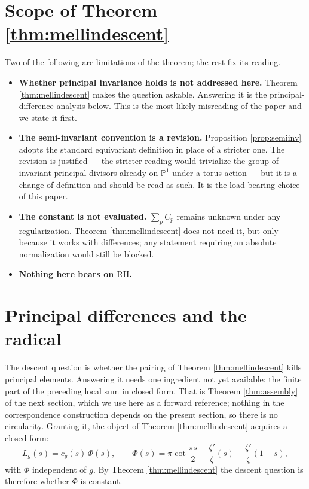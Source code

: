 \documentclass[11pt]{amsart}
\theoremstyle{definition}
\theoremstyle{remark}
\newcommand{\RH}{\mathrm{RH}}
\begin{document}
\section{Scope of Theorem \ref{thm:mellindescent}}

Two of the following are limitations of the theorem; the rest fix its
reading.

\begin{itemize}
\item \textbf{Whether principal invariance holds is not addressed here.}
Theorem \ref{thm:mellindescent} makes the question askable.  Answering it is
the principal-difference analysis below.  This is the most likely misreading of the paper and we state it
first.

\item \textbf{The semi-invariant convention is a revision.}  Proposition
\ref{prop:semiinv} adopts the standard equivariant definition in place of a
stricter one.  The revision is justified --- the stricter reading would
trivialize the group of invariant principal divisors already on
$\mathbb P^1$ under a torus action --- but it is a change of definition and
should be read as such.  It is the load-bearing choice of this paper.

\item \textbf{The constant is not evaluated.}  $\sum_pC_p$ remains unknown
under any regularization.  Theorem \ref{thm:mellindescent} does not need it, but
only because it works with differences; any statement requiring an absolute
normalization would still be blocked.

\item \textbf{Nothing here bears on $\RH$.}
\end{itemize}

\section{Principal differences and the radical}

The descent question is whether the pairing of Theorem \ref{thm:mellindescent}
kills principal elements.  Answering it needs one ingredient not yet
available: the finite part of the preceding local sum in closed form.  That
is Theorem \ref{thm:assembly} of the next section, which we use here as a
forward reference; nothing in the correspondence construction depends on the present section, so
there is no circularity.  Granting it, the object of Theorem
\ref{thm:mellindescent} acquires a closed form:
\begin{equation}\label{eq:Lg}
 L_g(s)=c_g(s)\,\Phi(s),
 \qquad
 \Phi(s)=\pi\cot\frac{\pi s}{2}-\frac{\zeta'}{\zeta}(s)
 -\frac{\zeta'}{\zeta}(1-s),
\end{equation}
with $\Phi$ independent of $g$.  By Theorem \ref{thm:mellindescent} the descent
question is therefore whether $\Phi$ is constant.
\end{document}
